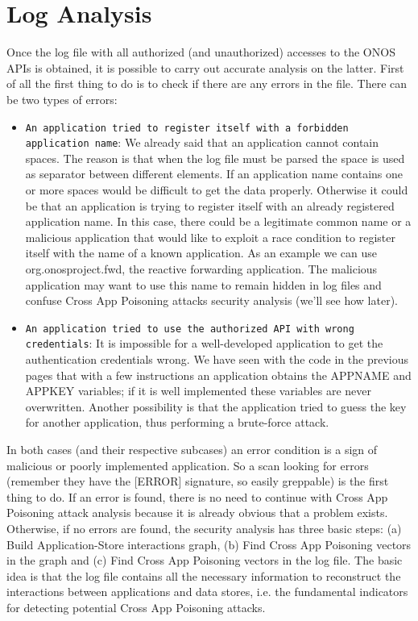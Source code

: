 \section{Log Analysis}
Once the log file with all authorized (and unauthorized) accesses to the ONOS APIs is obtained, it is possible to carry out accurate analysis on the latter. First of all the first thing to do is to check if there are any errors in the file. There can be two types of errors: 
\begin{itemize}
    \item\texttt{An application tried to register itself with a forbidden application name}: We already said that an application cannot contain spaces. The reason is that when the log file must be parsed the space is used as separator between different elements. If an application name contains one or more spaces would be difficult to get the data properly. Otherwise it could be that an application is trying to register itself with an already registered application name. In this case, there could be a legitimate common name or a malicious application that would like to exploit a race condition to register itself with the name of a known application. As an example we can use org.onosproject.fwd, the reactive forwarding application. The malicious application may want to use this name to remain hidden in log files and confuse Cross App Poisoning attacks security analysis (we'll see how later).
    \item\texttt{An application tried to use the authorized API with wrong credentials}: It is impossible for a well-developed application to get the authentication credentials wrong. We have seen with the code in the previous pages that with a few instructions an application obtains the APPNAME and APPKEY variables; if it is well implemented these variables are never overwritten. Another possibility is that the application tried to guess the key for another application, thus performing a brute-force attack.
\end{itemize}
In both cases (and their respective subcases) an error condition is a sign of malicious or poorly implemented application. So a scan looking for errors (remember they have the [ERROR] signature, so easily greppable) is the first thing to do. If an error is found, there is no need to continue with Cross App Poisoning attack analysis because it is already obvious that a problem exists.
Otherwise, if no errors are found, the security analysis has three basic steps: (a) Build Application-Store interactions graph, (b) Find Cross App Poisoning vectors in the graph and (c) Find Cross App Poisoning vectors in the log file. The basic idea is that the log file contains all the necessary information to reconstruct the interactions between applications and data stores, i.e. the fundamental indicators for detecting potential Cross App Poisoning attacks.

